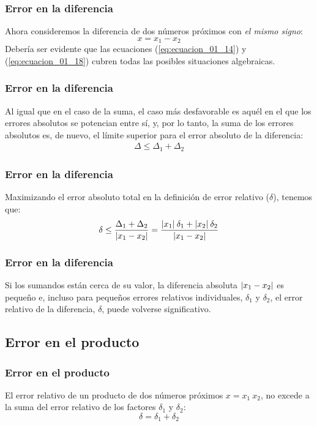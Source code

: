 \documentclass[12pt]{beamer}
\begin{document}
\begin{frame}
\frametitle{Error en la diferencia}
Ahora consideremos la diferencia de dos números próximos con \emph{el mismo signo}:
\pause
\begin{equation}
x = x_{1} - x_{2}
\label{eq:ecuacion_01_18}
\end{equation}
\pause
Debería ser evidente que las ecuaciones (\ref{eq:ecuacion_01_14}) y (\ref{eq:ecuacion_01_18}) cubren todas las posibles situaciones algebraicas.
\end{frame}
\begin{frame}
\frametitle{Error en la diferencia}
Al igual que en el caso de la suma, el caso más desfavorable es aquél en el que los errores absolutos se potencian entre sí, y, por lo tanto, la suma de los errores absolutos es, de nuevo, el límite superior para el error absoluto de la diferencia:
\pause
\begin{align*}
\Delta \leq  \Delta_{1} + \Delta_{2}
\end{align*}
\end{frame}
\begin{frame}
\frametitle{Error en la diferencia}
Maximizando el error absoluto total en la definición de error relativo ($\delta$), tenemos que:
\pause
\begin{equation}
\delta \leq \dfrac{\Delta_{1} + \Delta_{2}}{\abs{x_{1} - x_{2}}} = \dfrac{\abs{x_{1}} \: \delta_{1} + \abs{x_{2}} \: \delta_{2}}{\abs{x_{1} - x_{2}}}
\end{equation}
\end{frame}
\begin{frame}
\frametitle{Error en la diferencia}
Si los sumandos están cerca de su valor, la diferencia absoluta $\abs{x_{1} - x_{2}}$ es pequeño e, incluso para pequeños errores relativos individuales, $\delta_{1}$ y $\delta_{2}$, el error relativo de la diferencia, $\delta$, puede volverse significativo.
\end{frame}

\subsection{Error en el producto}

\begin{frame}
\frametitle{Error en el producto}
El error relativo de un producto de dos números próximos $x = x_{1} \: x_{2}$, no excede a la suma del error relativo de los factores $\delta_{1}$ y $\delta_{2}$:
\pause
\begin{equation}
\delta = \delta_{1} + \delta_{2}
\label{eq:ecuacion_01_20}
\end{equation}
\end{frame}
\end{document}
